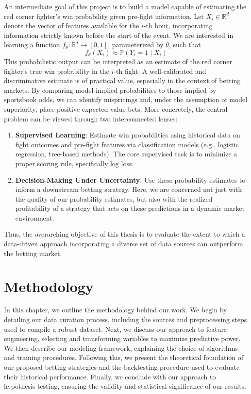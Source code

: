\documentclass[12pt,twoside]{report}
\begin{document}
An intermediate goal of this project is to build a model capable of estimating the red corner fighter's win probability given pre-fight information. Let $X_i \in \mathbb{R}^d$ denote the vector of features available for the $i$-th bout, incorporating information strictly known before the start of the event. We are interested in learning a function $f_\theta : \mathbb{R}^d \rightarrow [0, 1]$, parameterized by $\theta$, such that
$$f_\theta (X_i) \approx \mathbb{P}(Y_i = 1 \mid X_i)$$
This probabilistic output can be interpreted as an estimate of the red corner fighter’s true win probability in the $i$-th fight. A well-calibrated and discriminative estimate is of practical value, especially in the context of betting markets. By comparing model-implied probabilities to those implied by sportsbook odds, we can identify mispricings and, under the assumption of model superiority, place positive expected value bets. More concretely, the central problem can be viewed through two interconnected lenses:
\begin{enumerate}
    \item \textbf{Supervised Learning}: Estimate win probabilities using historical data on fight outcomes and pre-fight features via classification models (e.g., logistic regression, tree-based methods). The core supervised task is to minimize a proper scoring rule, specifically log loss.

    \item \textbf{Decision-Making Under Uncertainty}: Use these probability estimates to inform a downstream betting strategy. Here, we are concerned not just with the quality of our probability estimates, but also with the realized profitability of a strategy that acts on these predictions in a dynamic market environment.
\end{enumerate}
Thus, the overarching objective of this thesis is to evaluate the extent to which a data-driven approach incorporating a diverse set of data sources can outperform the betting market.


\chapter{Methodology}

In this chapter, we outline the methodology behind our work. We begin by detailing our data curation process, including the sources and preprocessing steps used to compile a robust dataset. Next, we discuss our approach to feature engineering, selecting and transforming variables to maximize predictive power. We then describe our modeling framework, explaining the choice of algorithms and training procedures. Following this, we present the theoretical foundation of our proposed betting strategies and the backtesting procedure used to evaluate their historical performance. Finally, we conclude with our approach to hypothesis testing, ensuring the validity and statistical significance of our results.
\end{document}
